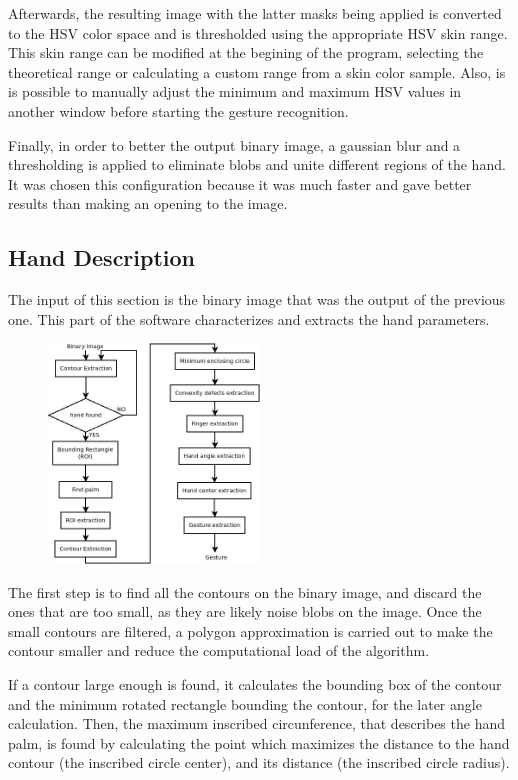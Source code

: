 Afterwards, the resulting image with the latter masks being applied is converted to the HSV color space and is thresholded using the appropriate HSV skin range.
This skin range can be modified at the begining of the program, selecting the theoretical range or calculating a custom range from a skin color sample. Also, is is possible to manually adjust the minimum and maximum HSV values in another window before starting the gesture recognition. 

Finally, in order to better the output binary image, a gaussian blur and a thresholding is applied to eliminate blobs and unite different regions of the hand. It was chosen this configuration because it was much faster and gave better results than making an opening to the image. 

 
\subsection{Hand Description}

The input of this section is the binary image that was the output of the previous one. This part of the software characterizes and extracts the hand parameters. 

\begin{figure}[H]
	\centering
	\includegraphics[width=0.5\textwidth]{../images/hand_description.jpeg} 
\end{figure}


The first step is to find all the contours on the binary image, and discard the ones that are too small, as they are likely noise blobs on the image. Once the small contours are filtered, a polygon approximation is carried out to make the contour smaller and reduce the computational load of the algorithm.

If a contour large enough is found, it calculates the bounding box of the contour and the minimum rotated rectangle bounding the contour, for the later angle calculation. Then, the maximum inscribed circunference, that describes the hand palm, is found by calculating the point which maximizes the distance to the hand contour (the inscribed circle center), and its distance (the inscribed circle radius).

